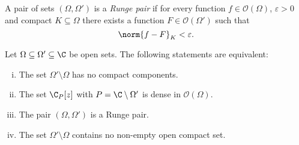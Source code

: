 \begin{definicija}
A pair of sets $(\Omega, \Omega')$ is a
\emph{Runge pair} if for every function
$f \in \mathcal{O}(\Omega)$, $\varepsilon > 0$ and compact
$K \subseteq \Omega$ there exists a function
$F \in \mathcal{O}(\Omega')$ such that
\[
\norm{f - F}_K < \varepsilon.
\]
\end{definicija}

\begin{izrek}
Let $\Omega \subseteq \Omega' \subseteq \C$ be open sets. The
following statements are equivalent:

\begin{enumerate}[i)]
\item The set $\Omega' \setminus \Omega$ has no compact components.
\item The set $\C_P[z]$ with $P = \C \setminus \Omega'$ is dense in
$\mathcal{O}(\Omega)$.
\item The pair $(\Omega, \Omega')$ is a Runge pair.
\item The set $\Omega' \setminus \Omega$ contains no non-empty open
compact set.
\end{enumerate}
\end{izrek}

